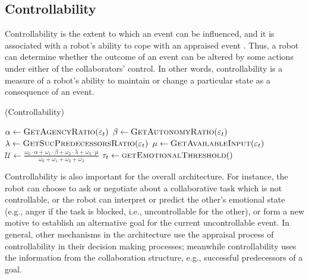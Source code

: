 \documentclass{article}
\begin{document}
\subsection{Controllability}
\label{sec:controllability}

Controllability is the extent to which an event can be influenced, and it is
associated with a robot's ability to cope with an appraised event
\cite{gratch:domain-independent}. Thus, a robot can determine whether the
outcome of an event can be altered by some actions under either of the
collaborators' control. In other words, controllability is a measure of a
robot's ability to maintain or change a particular state as a consequence of an
event.

\begin{algorithm}
	\caption{(Controllability)}
	\label{alg:controllability}
	\begin{algorithmic}[1]
			\State $\alpha \gets \Call{GetAgencyRatio}{\varepsilon_t}$ 
			\State $\beta \gets \Call{GetAutonomyRatio}{\varepsilon_t}$
			\State $\lambda \gets \Call{GetSucPredecessorsRatio}{\varepsilon_t}$
			\State $\mu \gets \Call{GetAvailableInput}{\varepsilon_t}$
			\State $\mathcal{U} \gets
			\frac{\omega_{0}\cdot \alpha + \omega_{1}\cdot \beta + \omega_{2}\cdot
			\lambda + \omega_{3}\cdot \mu}{\omega_{0} + \omega_{1} + \omega_{2} +
			\omega_{3}}$
			\State $\tau_{t} \gets \Call{getEmotionalThreshold}{ }$
				\State {}
			\Else
				\State {}
			\EndIf
		\EndFunction
	\end{algorithmic}
\end{algorithm}

\vspace*{-3mm}
Controllability is also important for the overall architecture. For instance,
the robot can choose to ask or negotiate about a collaborative task which is
not controllable, or the robot can interpret or predict the other's emotional
state (e.g., anger if the task is blocked, i.e., uncontrollable for the other),
or form a new motive to establish an alternative goal for the current
uncontrollable event. In general, other mechanisms in the architecture use the
appraisal process of controllability in their decision making processes;
meanwhile controllability uses the information from the collaboration structure,
e.g., successful predecessors of a goal.
\end{document}
